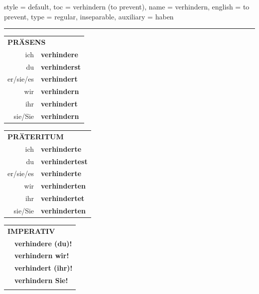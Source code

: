 \begin{verbentry}{
  style = {default},
  toc = {verhindern (to prevent)},
  name = {verhindern},
  english = {to prevent},
  type = {regular, inseparable},
  auxiliary = {haben}
}
 
    
     \vspace{5pt}

    \hrule
    
    \vspace{5pt}

  \begin{tabular}{rl}
     \multicolumn{2}{l}{\textbf{PRÄSENS} }\\
    ich & \textbf{verhindere}\\
    du & \textbf{verhinderst}\\
    er/sie/es & \textbf{verhindert}\\
    wir & \textbf{verhindern}\\
    ihr & \textbf{verhindert}\\
    sie/Sie & \textbf{verhindern}\\
  \end{tabular}
  \hfill
     \begin{tabular}{rl}
    \multicolumn{2}{l}{\textbf{PRÄTERITUM} }\\
    ich & \textbf{verhinderte}\\
    du & \textbf{verhindertest}\\
    er/sie/es & \textbf{verhinderte}\\
    wir & \textbf{verhinderten}\\
    ihr & \textbf{verhindertet}\\
    sie/Sie & \textbf{verhinderten}\\
  \end{tabular}
  \hfill
  \begin{tabular}{rl}
     \multicolumn{2}{l}{\textbf{IMPERATIV} }\\
   & \textbf{verhindere (du)!}\\
   & \textbf{verhindern wir!}\\
   & \textbf{verhindert (ihr)!}\\
   & \textbf{verhindern Sie!}\\
   & \vspace{10pt}
  \end{tabular}

    \vspace{10pt}


\end{verbentry}
